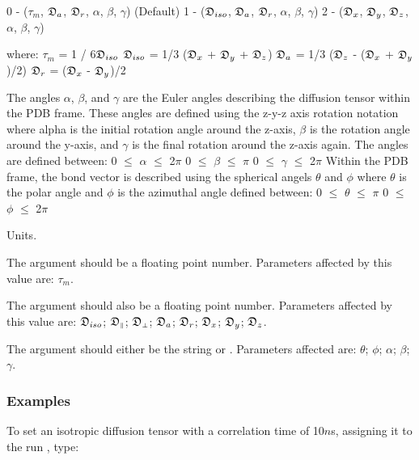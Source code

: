     0 - ($\tau_m$, $\mathfrak{D}_a$, $\mathfrak{D}_r$, $\alpha$, $\beta$, $\gamma$)   (Default)
    1 - ($\mathfrak{D}_{iso}$, $\mathfrak{D}_a$, $\mathfrak{D}_r$, $\alpha$, $\beta$, $\gamma$)
    2 - ($\mathfrak{D}_x$, $\mathfrak{D}_y$, $\mathfrak{D}_z$, $\alpha$, $\beta$, $\gamma$)

where:
    $\tau_m$ = 1 / 6$\mathfrak{D}_{iso}$
    $\mathfrak{D}_{iso}$ = 1/3 ($\mathfrak{D}_x$ + $\mathfrak{D}_y$ + $\mathfrak{D}_z$)
    $\mathfrak{D}_a$ = 1/3 ($\mathfrak{D}_z$ - ($\mathfrak{D}_x$ + $\mathfrak{D}_y$)/2)
    $\mathfrak{D}_r$ = ($\mathfrak{D}_x$ - $\mathfrak{D}_y$)/2

The angles $\alpha$, $\beta$, and $\gamma$ are the Euler angles describing the diffusion tensor
within the PDB frame.  These angles are defined using the z-y-z axis rotation notation where
alpha is the initial rotation angle around the z-axis, $\beta$ is the rotation angle around the
y-axis, and $\gamma$ is the final rotation around the z-axis again.  The angles are defined
between:
    0 $\le$ $\alpha$ $\le$ 2$\pi$
    0 $\le$ $\beta$ $\le$ $\pi$
    0 $\le$ $\gamma$ $\le$ 2$\pi$
Within the PDB frame, the bond vector is described using the spherical angels $\theta$ and $\phi$
where $\theta$ is the polar angle and $\phi$ is the azimuthal angle defined between:
    0 $\le$ $\theta$ $\le$ $\pi$
    0 $\le$ $\phi$ $\le$ 2$\pi$


Units.

The 
 argument should be a floating point number.  Parameters affected by this
value are:  $\tau_m$.

The 
 argument should also be a floating point number.  Parameters affected by this
value are:  $\mathfrak{D}_{iso}$; $\mathfrak{D}_{\scriptscriptstyle \parallel}$; $\mathfrak{D}_{\scriptscriptstyle \perp}$; $\mathfrak{D}_a$; $\mathfrak{D}_r$; $\mathfrak{D}_x$; $\mathfrak{D}_y$; $\mathfrak{D}_z$.

The 
 argument should either be the string 
 or 
.  Parameters affected
are:  $\theta$; $\phi$; $\alpha$; $\beta$; $\gamma$.



\subsubsection{Examples}

To set an isotropic diffusion tensor with a correlation time of 10$n$s, assigning it to the
run 
, type:



